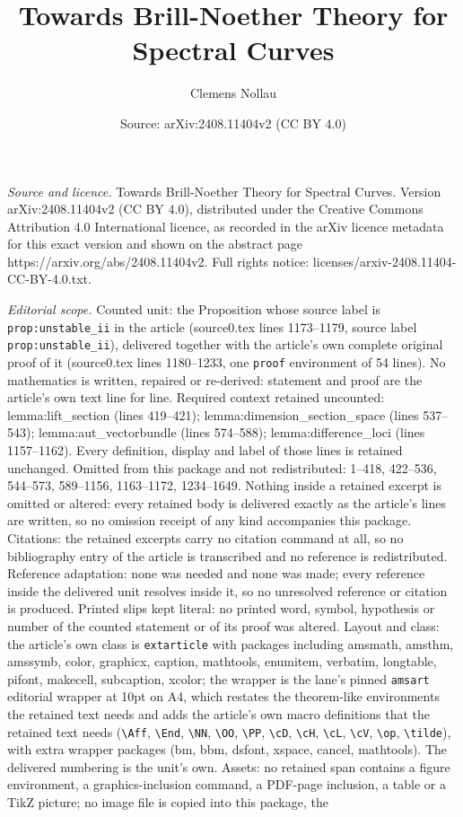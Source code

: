 \documentclass[10pt,a4paper]{amsart}
\title[Towards Brill-Noether Theory for Spectral Curves]{Towards Brill-Noether Theory for Spectral Curves}
\author{Clemens Nollau}
\date{Source: arXiv:2408.11404v2 (CC BY 4.0)}
\begin{document}
\maketitle

\noindent\emph{Source and licence.} Towards Brill-Noether Theory for Spectral Curves. Version arXiv:2408.11404v2 (CC BY 4.0), distributed under the Creative Commons Attribution 4.0 International licence, as recorded in the arXiv licence metadata for this exact version and shown on the abstract page https://arxiv.org/abs/2408.11404v2. Full rights notice: licenses/arxiv-2408.11404-CC-BY-4.0.txt.\par\smallskip

\noindent\textit{Editorial scope.} Counted unit: the Proposition whose source label is \texttt{prop:unstable\_ii} in the article (source0.tex lines 1173--1179, source label \texttt{prop:unstable\_ii}), delivered together with the article's own complete original proof of it (source0.tex lines 1180--1233, one \texttt{proof} environment of 54 lines). No mathematics is written, repaired or re-derived: statement and proof are the article's own text line for line. Required context retained uncounted: lemma:lift\_section (lines 419--421); lemma:dimension\_section\_space (lines 537--543); lemma:aut\_vectorbundle (lines 574--588); lemma:difference\_loci (lines 1157--1162). Every definition, display and label of those lines is retained unchanged. Omitted from this package and not redistributed: 1--418, 422--536, 544--573, 589--1156, 1163--1172, 1234--1649. Nothing inside a retained excerpt is omitted or altered: every retained body is delivered exactly as the article's lines are written, so no omission receipt of any kind accompanies this package. Citations: the retained excerpts carry no citation command at all, so no bibliography entry of the article is transcribed and no reference is redistributed. Reference adaptation: none was needed and none was made; every reference inside the delivered unit resolves inside it, so no unresolved reference or citation is produced. Printed slips kept literal: no printed word, symbol, hypothesis or number of the counted statement or of its proof was altered. Layout and class: the article's own class is \texttt{extarticle} with packages including amsmath, amsthm, amssymb, color, graphicx, caption, mathtools, enumitem, verbatim, longtable, pifont, makecell, subcaption, xcolor; the wrapper is the lane's pinned \texttt{amsart} editorial wrapper at 10pt on A4, which restates the theorem-like environments the retained text needs and adds the article's own macro definitions that the retained text needs (\texttt{\textbackslash Aff}, \texttt{\textbackslash End}, \texttt{\textbackslash NN}, \texttt{\textbackslash OO}, \texttt{\textbackslash PP}, \texttt{\textbackslash cD}, \texttt{\textbackslash cH}, \texttt{\textbackslash cL}, \texttt{\textbackslash cV}, \texttt{\textbackslash op}, \texttt{\textbackslash tilde}), with extra wrapper packages (bm, bbm, dsfont, xspace, cancel, mathtools). The delivered numbering is the unit's own. Assets: no retained span contains a figure environment, a graphics-inclusion command, a PDF-page inclusion, a table or a TikZ picture; no image file is copied into this package, the 
\end{document}
